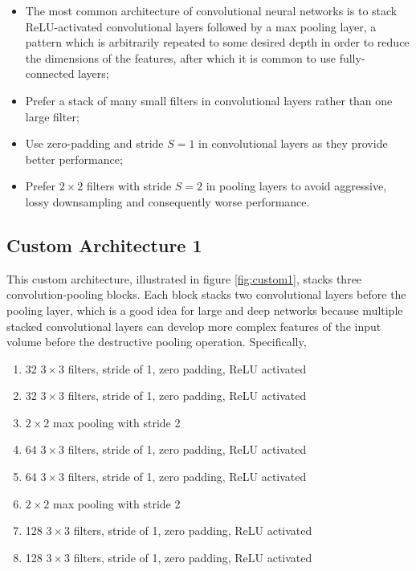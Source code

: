 \begin{itemize}
    \item The most common architecture of convolutional neural networks is to stack ReLU-activated convolutional layers followed by a max pooling layer, a pattern which is arbitrarily repeated to some desired depth in order to reduce the dimensions of the features, after which it is common to use fully-connected layers;
    \item Prefer a stack of many small filters in convolutional layers rather than one large filter;
    \item Use zero-padding and stride $S = 1$ in convolutional layers as they provide better performance;
    \item Prefer $2 \times 2$ filters with stride $S = 2$ in pooling layers to avoid aggressive, lossy downsampling and consequently worse performance.
\end{itemize}

\subsection{Custom Architecture 1}

This custom architecture, illustrated in figure \ref{fig:custom1}, stacks three convolution-pooling blocks. Each block stacks two convolutional layers before the pooling layer, which is a good idea for large and deep networks because multiple stacked convolutional layers can develop more complex features of the input volume before the destructive pooling operation. Specifically,

\begin{enumerate}
    \item 32 $3 \times 3$ filters, stride of 1, zero padding, ReLU activated
    \item 32 $3 \times 3$ filters, stride of 1, zero padding, ReLU activated
    \item $2 \times 2$ max pooling with stride 2
    \item 64 $3 \times 3$ filters, stride of 1, zero padding, ReLU activated
    \item 64 $3 \times 3$ filters, stride of 1, zero padding, ReLU activated
    \item $2 \times 2$ max pooling with stride 2
    \item 128 $3 \times 3$ filters, stride of 1, zero padding, ReLU activated
    \item 128 $3 \times 3$ filters, stride of 1, zero padding, ReLU activated
\end{enumerate}

